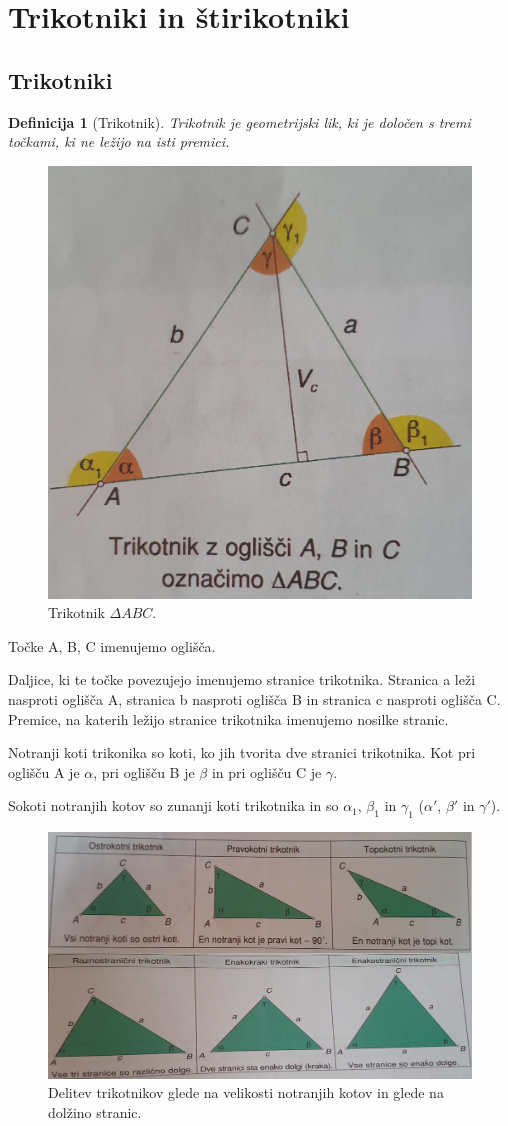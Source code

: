\documentclass{article}
\newtheorem{definicija}{Definicija}[subsection]
\begin{document}
\pagestyle{empty}

\section{ Trikotniki in štirikotniki }
\subsection{ Trikotniki }

\begin{definicija}[Trikotnik]
    Trikotnik je geometrijski lik, ki je določen s tremi točkami, ki ne ležijo na isti premici. 
\end{definicija}

\begin{figure}[h]
    \includegraphics[width=0.4\linewidth]{trikotnik.png}
    \centering
    \caption{Trikotnik $\Delta ABC$.}
\end{figure}

Točke A, B, C imenujemo oglišča.

Daljice, ki te točke povezujejo imenujemo stranice trikotnika.
Stranica a leži nasproti oglišča A, stranica b nasproti oglišča B in stranica c nasproti oglišča C. Premice, na katerih ležijo stranice trikotnika imenujemo nosilke stranic.

Notranji koti trikonika so koti, ko jih tvorita dve stranici trikotnika.
Kot pri oglišču A  je $\alpha$, pri oglišču B je $\beta$ in pri oglišču C je $\gamma$.

Sokoti notranjih kotov so zunanji koti trikotnika in so $\alpha_1$, $\beta_1$ in $\gamma_1$ ($\alpha'$, $\beta'$ in $\gamma'$).

\begin{figure}[h]
    \includegraphics[width=0.7\linewidth]{delitevGledeNaKoteInStranice.png}
    \centering
    \caption{Delitev trikotnikov glede na velikosti notranjih kotov in glede na dolžino stranic.}
\end{figure}
\end{document}
